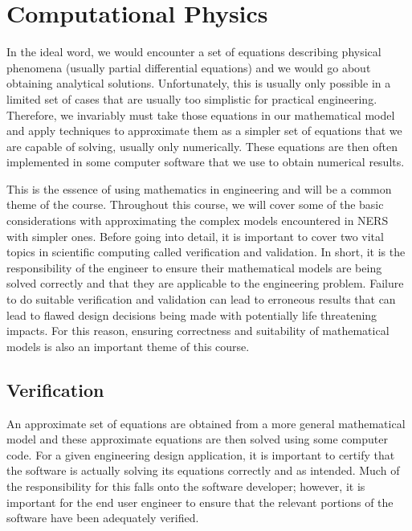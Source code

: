 \section{Computational Physics}

In the ideal word, we would encounter a set of equations describing physical phenomena (usually partial differential equations) and we would go about obtaining analytical solutions. Unfortunately, this is usually only possible in a limited set of cases that are usually too simplistic for practical engineering. Therefore, we invariably must take those equations in our mathematical model and apply techniques to approximate them as a simpler set of equations that we are capable of solving, usually only numerically. These equations are then often implemented in some computer software that we use to obtain numerical results.

This is the essence of using mathematics in engineering and will be a common theme of the course. Throughout this course, we will cover some of the basic considerations with approximating the complex models encountered in NERS with simpler ones. Before going into detail, it is important to cover two vital topics in scientific computing called verification and validation. In short, it is the responsibility of the engineer to ensure their mathematical models are being solved correctly and that they are applicable to the engineering problem. Failure to do suitable verification and validation can lead to erroneous results that can lead to flawed design decisions being made with potentially life threatening impacts. For this reason, ensuring correctness and suitability of mathematical models is also an important theme of this course.

\subsection{Verification}

An approximate set of equations are obtained from a more general mathematical model and these approximate equations are then solved using some computer code. For a given engineering design application, it is important to certify that the software is actually solving its equations correctly and as intended. Much of the responsibility for this falls onto the software developer; however, it is important for the end user engineer to ensure that the relevant portions of the software have been adequately verified.

